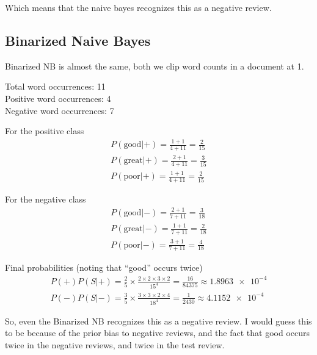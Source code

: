 Which means that the naive bayes recognizes this as a negative review.

\subsection*{Binarized Naive Bayes}
Binarized NB is almost the same, both we clip word counts in a document at 1.

Total word occurrences: 11 \\
Positive word occurrences: 4 \\
Negative word occurrences: 7

For the positive class
\begin{equation}
  \begin{split}
    P(\text{good}|+) = \frac{1+1}{4+11} = \frac{2}{15} \\
    P(\text{great}|+) = \frac{2+1}{4+11} = \frac{3}{15} \\
    P(\text{poor}|+) = \frac{1+1}{4+11} = \frac{2}{15}
  \end{split}
\end{equation}

For the negative class
\begin{equation}
  \begin{split}
    P(\text{good}|-) = \frac{2+1}{7+11} = \frac{3}{18} \\
    P(\text{great}|-) = \frac{1+1}{7+11} = \frac{2}{18} \\
    P(\text{poor}|-) = \frac{3+1}{7+11} = \frac{4}{18}
  \end{split}
\end{equation}

Final probabilities (noting that ``good'' occurs twice)
\begin{equation}
  \begin{split}
    P(+)P(S|+) = \frac{2}{5} \times \frac{2 \times 2 \times 3 \times 2}{15^4} =
    \frac{16}{84375} \approx \num{1.8963e-4} \\
    P(-)P(S|-) = \frac{3}{5} \times \frac{3 \times 3 \times 2 \times 4}{18^4} =
    \frac{1}{2430} \approx \num{4.1152e-4}
  \end{split}
\end{equation}

So, even the Binarized NB recognizes this as a negative review. I would guess
this to be because of the prior bias to negative reviews, and the fact that
good occurs twice in the negative reviews, and twice in the test review.


































